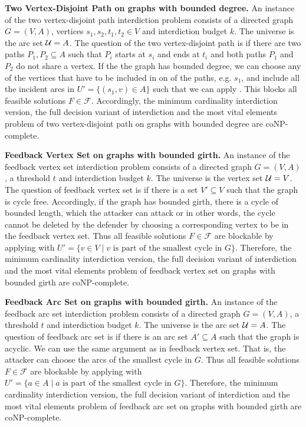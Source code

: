 \textbf{Two Vertex-Disjoint Path on graphs with bounded degree.}
An instance of the two vertex-disjoint path interdiction problem consists of a directed graph $G=(V,A)$, vertices $s_1, s_2, t_1, t_2 \in V$ and interdiction budget $k$.
The universe is the arc set $\mathcal{U} = A$.
The question of the two vertex-disjoint path is if there are two paths $P_1, P_2 \subseteq A$ such that $P_i$ starts at $s_i$ and ends at $t_i$ and both paths $P_1$ and $P_2$ do not share a vertex.
If the the graph has bounded degree, we can choose any of the vertices that have to be included in on of the paths, e.g. $s_1$, and include all the incident arcs in $U' = \{(s_1, v) \in A\}$ such that we can apply .
This blocks all feasible solutions $F \in \mathcal F$.
Accordingly, the minimum cardinality interdiction version, the full decision variant of interdiction and the most vital elements problem of two vertex-disjoint path on graphs with bounded degree are coNP-complete.

\textbf{Feedback Vertex Set on graphs with bounded girth.}
An instance of the feedback vertex set interdiction problem consists of a directed graph $G=(V,A)$, a threshold $t$ and interdiction budget $k$.
The universe is the vertex set $\mathcal{U} = V$.
The question of feedback vertex set is if there is a set $V' \subseteq V$ such that the graph is cycle free.
Accordingly, if the graph has bounded girth, there is a cycle of bounded length, which the attacker can attack or in other words, the cycle cannot be deleted by the defender by choosing a corresponding vertex to be in the feedback vertex set.
Thus all feasible solutions $F \in \mathcal F$ are blockable by applying  with $U' = \{v \in V \mid v \text{ is part of the smallest cycle in } G\}$.
Therefore, the minimum cardinality interdiction version, the full decision variant of interdiction and the most vital elements problem of feedback vertex set on graphs with bounded girth are coNP-complete.

\textbf{Feedback Arc Set on graphs with bounded girth.}
An instance of the feedback arc set interdiction problem consists of a directed graph $G=(V,A)$, a threshold $t$ and interdiction budget $k$.
The universe is the arc set $\mathcal{U} = A$.
The question of feedback arc set is if there is an arc set $A' \subseteq A$ such that the graph is acyclic.
We can use the same argument as in feedback vertex set.
That is, the attacker can choose the arcs of the smallest cycle in $G$.
Thus all feasible solutions $F \in \mathcal F$ are blockable by applying  with $U' = \{a \in A \mid a \text{ is part of the smallest cycle in } G\}$.
Therefore, the minimum cardinality interdiction version, the full decision variant of interdiction and the most vital elements problem of feedback arc set on graphs with bounded girth are coNP-complete.


